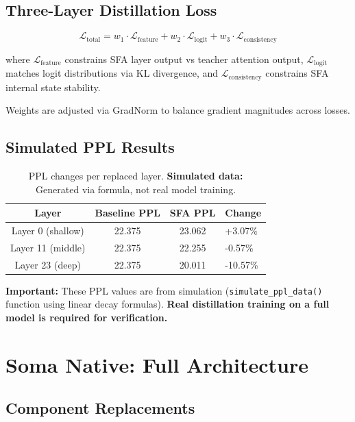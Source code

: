 \documentclass[11pt]{article}
\begin{document}
\subsection{Three-Layer Distillation Loss}
\label{sec:loss}

\begin{equation}
\mathcal{L}_{\text{total}} = w_1 \cdot \mathcal{L}_{\text{feature}} + w_2 \cdot \mathcal{L}_{\text{logit}} + w_3 \cdot \mathcal{L}_{\text{consistency}}
\end{equation}

where $\mathcal{L}_{\text{feature}}$ constrains SFA layer output vs teacher attention output, $\mathcal{L}_{\text{logit}}$ matches logit distributions via KL divergence, and $\mathcal{L}_{\text{consistency}}$ constrains SFA internal state stability.

Weights are adjusted via GradNorm \citep{chen2018gradnorm} to balance gradient magnitudes across losses.

\subsection{Simulated PPL Results}

\begin{table}[h]
\centering
\begin{tabular}{ccc}
\toprule
Layer & Baseline PPL & SFA PPL & Change \\
\midrule
Layer 0 (shallow) & 22.375 & 23.062 & +3.07\% \\
Layer 11 (middle) & 22.375 & 22.255 & -0.57\% \\
Layer 23 (deep) & 22.375 & 20.011 & -10.57\% \\
\bottomrule
\end{tabular}
\caption{PPL changes per replaced layer. \textbf{Simulated data:} Generated via formula, not real model training.}
\end{table}

\noindent\textbf{Important:} These PPL values are from simulation (\texttt{simulate\_ppl\_data()} function using linear decay formulas). \textbf{Real distillation training on a full model is required for verification.}

\section{Soma Native: Full Architecture}

\subsection{Component Replacements}
\end{document}
